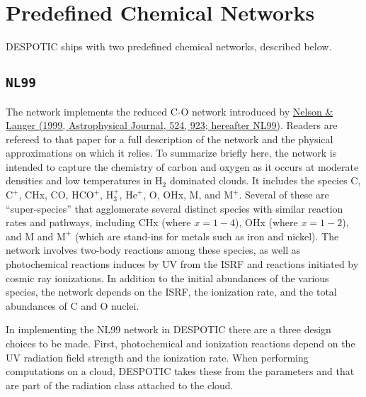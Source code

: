 \documentclass[letterpaper,10pt,english]{sphinxmanual}
\begin{document}
\section{Predefined Chemical Networks}
\label{chemistry:predefined-chemical-networks}\label{chemistry:ssec-predefined-networks}
DESPOTIC ships with two predefined chemical networks, described below.


\subsection{\texttt{NL99}}
\label{chemistry:nl99}\label{chemistry:sssec-nl99}
The  network implements the reduced C-O network introduced by
\href{http://adsabs.harvard.edu/abs/1999ApJ...524..923N}{Nelson \& Langer (1999, Astrophysical Journal, 524, 923; hereafter
NL99)}. Readers
are refereed to that paper for a full description of the network and
the physical approximations on which it relies. To summarize briefly
here, the network is intended to capture the chemistry of carbon and
oxygen as it occurs at moderate densities and low temperatures in
\(\mathrm{H}_2\) dominated clouds. It includes the species C,
\(\mathrm{C}^+\), CHx, CO, \(\mathrm{HCO}^+\),
\(\mathrm{H}^+_3\), \(\mathrm{He}^+\), O, OHx, M, and
\(\mathrm{M}^+\). Several of these are ``super-species'' that
agglomerate several distinct species with similar reaction rates and
pathways, including CHx (where \(x = 1-4\)), OHx (where \(x =
1-2\)), and M and \(\mathrm{M}^+\) (which are stand-ins for metals
such as iron and nickel). The network involves two-body reactions
among these species, as well as photochemical reactions induces by UV
from the ISRF and reactions initiated by cosmic ray ionizations. In
addition to the initial abundances of the various species, the network
depends on the ISRF, the ionization rate, and the total abundances of
C and O nuclei.

In implementing the NL99 network in DESPOTIC there are a three design
choices to be made. First, photochemical and ionization reactions
depend on the UV radiation field strength and the ionization
rate. When performing computations on a cloud, DESPOTIC takes these
from the parameters  and  that are part of the radiation
class attached to the cloud.
\end{document}
